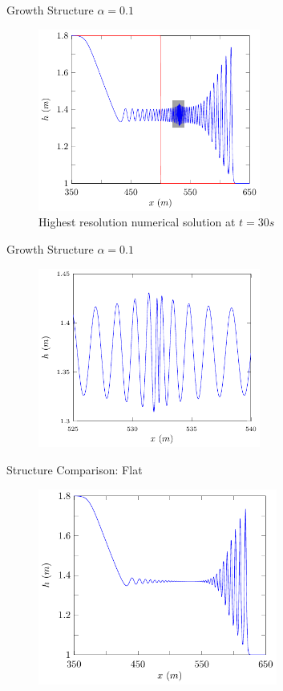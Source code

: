 \documentclass[pdf]{beamer}
\begin{document}

\begin{frame}{Growth Structure $\alpha = 0.1$}
	\begin{figure}
		\includegraphics[width=0.65\textwidth]{./Pictures/Results/Example/growth.pdf}
		\caption{Highest resolution numerical solution at $t=30s$}
	\end{figure}
\end{frame}

\begin{frame}{Growth Structure $\alpha = 0.1$}
	\begin{figure}
		\includegraphics[width=0.65\textwidth]{./Pictures/Results/Example/growthz.pdf}
	\end{figure}
\end{frame}

\begin{frame}{Structure Comparison: Flat}
		\begin{figure}
			\includegraphics[width=0.7\textwidth]{./Pictures/Results/Example/6.pdf}
		\end{figure}
\end{frame}
\end{document}
